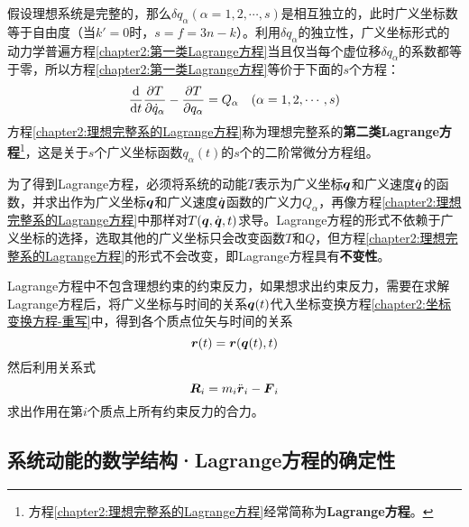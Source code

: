 假设理想系统是完整的，那么$\delta q_\alpha(\alpha=1,2,\cdots,s)$是相互独立的，此时广义坐标数等于自由度（当$k'=0$时，$s=f=3n-k$）。利用$\delta q_\alpha$的独立性，广义坐标形式的动力学普遍方程\eqref{chapter2:第一类Lagrange方程}当且仅当每个虚位移$\delta q_\alpha$的系数都等于零，所以方程\eqref{chapter2:第一类Lagrange方程}等价于下面的$s$个方程：
\begin{equation}
	\frac{\mathrm{d}}{\mathrm{d} t} \frac{\partial T}{\partial \dot{q}_\alpha} - \frac{\partial T}{\partial q_\alpha} = Q_\alpha \quad (\alpha = 1,2,\cdots,s)
	\label{chapter2:理想完整系的Lagrange方程}
\end{equation}
方程\eqref{chapter2:理想完整系的Lagrange方程}称为理想完整系的{\bf 第二类Lagrange方程}\footnote{方程\eqref{chapter2:理想完整系的Lagrange方程}经常简称为{\bf Lagrange方程}。}，这是关于$s$个广义坐标函数$q_\alpha(t)$的$s$个的二阶常微分方程组。

为了得到Lagrange方程，必须将系统的动能$T$表示为广义坐标$\boldsymbol{q}$和广义速度$\dot{\boldsymbol{q}}$的函数，并求出作为广义坐标$\boldsymbol{q}$和广义速度$\dot{\boldsymbol{q}}$函数的广义力$Q_\alpha$，再像方程\eqref{chapter2:理想完整系的Lagrange方程}中那样对$T(\boldsymbol{q},\dot{\boldsymbol{q}},t)$求导。Lagrange方程的形式不依赖于广义坐标的选择，选取其他的广义坐标只会改变函数$T$和$Q$，但方程\eqref{chapter2:理想完整系的Lagrange方程}的形式不会改变，即Lagrange方程具有{\bf 不变性}。

Lagrange方程中不包含理想约束的约束反力，如果想求出约束反力，需要在求解Lagrange方程后，将广义坐标与时间的关系$\boldsymbol{q}(t)$代入坐标变换方程\eqref{chapter2:坐标变换方程-重写}中，得到各个质点位矢与时间的关系
\begin{equation*}
	\boldsymbol{r}(t) = \boldsymbol{r}(\boldsymbol{q}(t),t)
\end{equation*}
然后利用关系式
\begin{equation*}
	\boldsymbol{R}_i = m_i\ddot{\boldsymbol{r}}_i - \boldsymbol{F}_i
\end{equation*}
求出作用在第$i$个质点上所有约束反力的合力。

\subsection{系统动能的数学结构·Lagrange方程的确定性}\label{chapter2:subsection-系统动能的数学结构}


